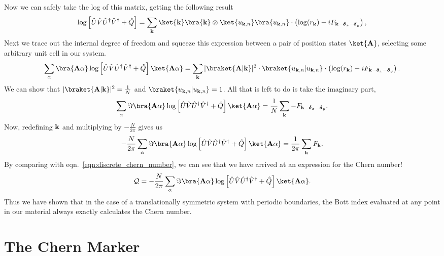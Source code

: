 Now we can safely take the log of this matrix, getting the following result
\begin{align}
	\log \left [ \hat U\hat V\hat U^\dag \hat V^\dag + \hat Q \right ] = \sum_{\textbf k} \ket{\textbf k } \bra{\textbf k } \otimes  \ket {u_{\textbf k, n}} \bra{u_{\textbf k, n}} \cdot \left ( \log(r_{\textbf k})-i F_{\textbf k-\boldsymbol{\delta}_x-\boldsymbol{\delta}_y}\right ),
\end{align}
Next we trace out the internal degree of freedom and squeeze this expression between a pair of position states $\ket {\textbf A}$, selecting some arbitrary unit cell in our system. 
\begin{align}
	\sum_\alpha \bra{\textbf A \alpha}\log \left [ \hat U\hat V\hat U^\dag \hat V^\dag + \hat Q \right ]   \ket{\textbf A \alpha} = \sum_{\textbf k} |\braket{\textbf A|\textbf k}|^2 \cdot  \braket{u_{\textbf k, n}|u_{\textbf k, n} } \cdot \left ( \log(r_{\textbf k})-i F_{\textbf k-\boldsymbol{\delta}_x-\boldsymbol{\delta}_y}\right ).
\end{align}
We can show that $|\braket{\textbf A|\textbf k}|^2 = \frac{1}{N}$ and $\braket{u_{\textbf k, n}|u_{\textbf k, n} } = 1$. All that is left to do is take the imaginary part, 
\begin{align}
	\sum_\alpha \Im \bra{\textbf A \alpha}\log \left [ \hat U\hat V\hat U^\dag \hat V^\dag + \hat Q \right ]   \ket{\textbf A \alpha} = \frac{1}{N} \sum_{\textbf k} - F_{\textbf k-\boldsymbol{\delta}_x-\boldsymbol{\delta}_y} .
\end{align}
Now, redefining $\textbf k$ and multiplying by $-\frac{N}{2\pi}$ gives us
\begin{align}
	-\frac{N}{2\pi} \sum_\alpha \Im \bra{\textbf A \alpha}\log \left [ \hat U\hat V\hat U^\dag \hat V^\dag + \hat Q \right ]   \ket{\textbf A \alpha} = \frac{1}{2\pi} \sum_{\textbf k}  F_{\textbf k}.
\end{align}
By comparing with eqn.~\ref{eqn:discrete_chern_number}, we can see that we have arrived at an expression for the Chern number!
\begin{align}
	\mathcal Q = -\frac{N}{2\pi} \sum_\alpha \Im \bra{\textbf A \alpha}\log \left [ \hat U\hat V\hat U^\dag \hat V^\dag + \hat Q \right ]   \ket{\textbf A \alpha} .
\end{align}
Thus we have shown that in the case of a translationally symmetric system with periodic boundaries, the Bott index evaluated at any point in our material always exactly calculates the Chern number.

\section{The Chern Marker} \label{sec:chern_marker}

